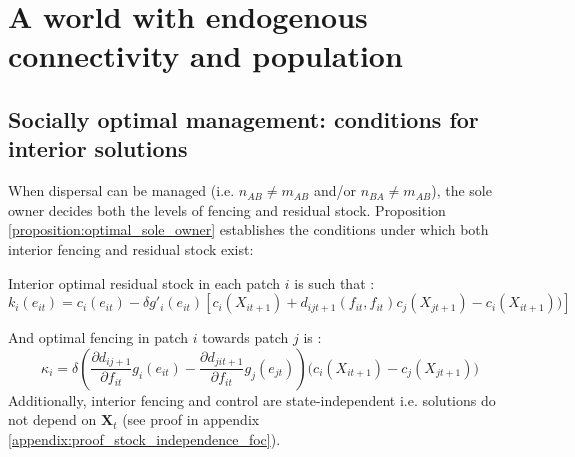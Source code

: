 

\section{A world with endogenous connectivity and population}

\subsection{Socially optimal management: conditions for interior solutions}

When dispersal can be managed (i.e. $n_{AB}\neq m_{AB}$ and/or $n_{BA}\neq m_{AB}$), the sole owner decides both the levels of fencing and residual stock. Proposition \ref{proposition:optimal_sole_owner} establishes the conditions under which both interior fencing and residual stock exist:

\begin{proposition}
\label{proposition:optimal_sole_owner}
Interior optimal residual stock in each patch $i$ is such that : 
\begin{equation}
k_i(e_{it}) = c_i(e_{it}) - \delta g'_i(e_{it})\left[c_i(X_{it+1}) + d_{ijt+1}(f_{it}, f_{it})c_j(X_{jt+1}) - c_i(X_{it+1})) \right]
\label{eq:optimal_harvest}
\end{equation}

And optimal fencing in patch $i$ towards patch $j$ is : 
\begin{equation}
\kappa_i = \delta\left(\frac{\partial d_{ij+1}}{\partial f_{it}} g_i(e_{it}) - \frac{\partial d_{jit+1}}{\partial f_{it}}g_j(e_{jt})\right) \big(c_i(X_{it+1}) - c_j(X_{jt+1})\big)
\label{eq:optimal_fencing}
\end{equation}
Additionally, interior fencing and control are state-independent i.e. solutions do not depend on $\mathbf{X}_t$ (see proof in appendix \ref{appendix:proof_stock_independence_foc}).
\end{proposition}

